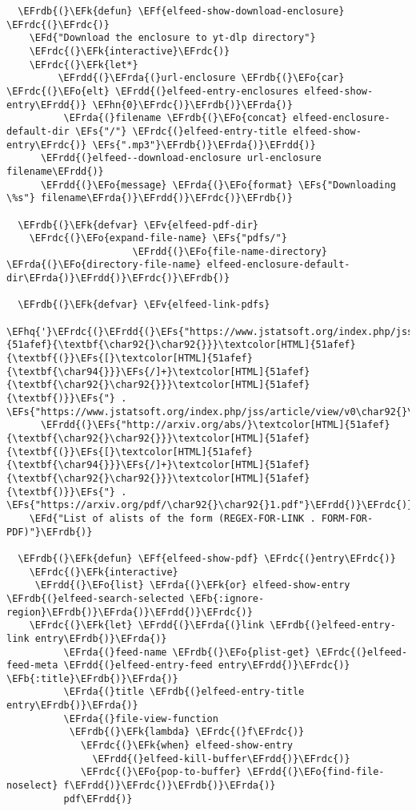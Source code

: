\documentclass[a4wide,10pt]{article}
\newcommand{\EFs}[1]{\textcolor{EFs}{#1}} %
\newcommand{\EFd}[1]{\textcolor{EFd}{#1}} %
\newcommand{\EFk}[1]{\textcolor{EFk}{#1}} %
\newcommand{\EFb}[1]{\textcolor{EFb}{#1}} %
\newcommand{\EFf}[1]{\textcolor{EFf}{#1}} %
\newcommand{\EFv}[1]{\textcolor{EFv}{#1}} %
\newcommand{\EFo}[1]{\textcolor{EFo}{#1}} %
\newcommand{\EFhn}[1]{\textcolor{EFhn}{\textbf{#1}}} %
\newcommand{\EFhq}[1]{\textcolor{EFhq}{#1}} %
\newcommand{\EFrda}[1]{\textcolor{EFrda}{#1}} %
\newcommand{\EFrdb}[1]{\textcolor{EFrdb}{#1}} %
\newcommand{\EFrdc}[1]{\textcolor{EFrdc}{#1}} %
\newcommand{\EFrdd}[1]{\textcolor{EFrdd}{#1}} %
\begin{document}
\begin{Code}
\begin{Verbatim}
  \EFrdb{(}\EFk{defun} \EFf{elfeed-show-download-enclosure} \EFrdc{(}\EFrdc{)}
    \EFd{"Download the enclosure to yt-dlp directory"}
    \EFrdc{(}\EFk{interactive}\EFrdc{)}
    \EFrdc{(}\EFk{let*}
         \EFrdd{(}\EFrda{(}url-enclosure \EFrdb{(}\EFo{car} \EFrdc{(}\EFo{elt} \EFrdd{(}elfeed-entry-enclosures elfeed-show-entry\EFrdd{)} \EFhn{0}\EFrdc{)}\EFrdb{)}\EFrda{)}
          \EFrda{(}filename \EFrdb{(}\EFo{concat} elfeed-enclosure-default-dir \EFs{"/"} \EFrdc{(}elfeed-entry-title elfeed-show-entry\EFrdc{)} \EFs{".mp3"}\EFrdb{)}\EFrda{)}\EFrdd{)}
      \EFrdd{(}elfeed--download-enclosure url-enclosure filename\EFrdd{)}
      \EFrdd{(}\EFo{message} \EFrda{(}\EFo{format} \EFs{"Downloading \%s"} filename\EFrda{)}\EFrdd{)}\EFrdc{)}\EFrdb{)}

  \EFrdb{(}\EFk{defvar} \EFv{elfeed-pdf-dir}
    \EFrdc{(}\EFo{expand-file-name} \EFs{"pdfs/"}
                      \EFrdd{(}\EFo{file-name-directory} \EFrda{(}\EFo{directory-file-name} elfeed-enclosure-default-dir\EFrda{)}\EFrdd{)}\EFrdc{)}\EFrdb{)}

  \EFrdb{(}\EFk{defvar} \EFv{elfeed-link-pdfs}
    \EFhq{'}\EFrdc{(}\EFrdd{(}\EFs{"https://www.jstatsoft.org/index.php/jss/article/view/v0}\textcolor[HTML]{51afef}{\textbf{\char92{}\char92{}}}\textcolor[HTML]{51afef}{\textbf{(}}\EFs{[}\textcolor[HTML]{51afef}{\textbf{\char94{}}}\EFs{/]+}\textcolor[HTML]{51afef}{\textbf{\char92{}\char92{}}}\textcolor[HTML]{51afef}{\textbf{)}}\EFs{"} . \EFs{"https://www.jstatsoft.org/index.php/jss/article/view/v0\char92{}\char92{}1/v\char92{}\char92{}1.pdf"}\EFrdd{)}
      \EFrdd{(}\EFs{"http://arxiv.org/abs/}\textcolor[HTML]{51afef}{\textbf{\char92{}\char92{}}}\textcolor[HTML]{51afef}{\textbf{(}}\EFs{[}\textcolor[HTML]{51afef}{\textbf{\char94{}}}\EFs{/]+}\textcolor[HTML]{51afef}{\textbf{\char92{}\char92{}}}\textcolor[HTML]{51afef}{\textbf{)}}\EFs{"} . \EFs{"https://arxiv.org/pdf/\char92{}\char92{}1.pdf"}\EFrdd{)}\EFrdc{)}
    \EFd{"List of alists of the form (REGEX-FOR-LINK . FORM-FOR-PDF)"}\EFrdb{)}

  \EFrdb{(}\EFk{defun} \EFf{elfeed-show-pdf} \EFrdc{(}entry\EFrdc{)}
    \EFrdc{(}\EFk{interactive}
     \EFrdd{(}\EFo{list} \EFrda{(}\EFk{or} elfeed-show-entry \EFrdb{(}elfeed-search-selected \EFb{:ignore-region}\EFrdb{)}\EFrda{)}\EFrdd{)}\EFrdc{)}
    \EFrdc{(}\EFk{let} \EFrdd{(}\EFrda{(}link \EFrdb{(}elfeed-entry-link entry\EFrdb{)}\EFrda{)}
          \EFrda{(}feed-name \EFrdb{(}\EFo{plist-get} \EFrdc{(}elfeed-feed-meta \EFrdd{(}elfeed-entry-feed entry\EFrdd{)}\EFrdc{)} \EFb{:title}\EFrdb{)}\EFrda{)}
          \EFrda{(}title \EFrdb{(}elfeed-entry-title entry\EFrdb{)}\EFrda{)}
          \EFrda{(}file-view-function
           \EFrdb{(}\EFk{lambda} \EFrdc{(}f\EFrdc{)}
             \EFrdc{(}\EFk{when} elfeed-show-entry
               \EFrdd{(}elfeed-kill-buffer\EFrdd{)}\EFrdc{)}
             \EFrdc{(}\EFo{pop-to-buffer} \EFrdd{(}\EFo{find-file-noselect} f\EFrdd{)}\EFrdc{)}\EFrdb{)}\EFrda{)}
          pdf\EFrdd{)}


\end{Verbatim}
\end{Code}
\end{document}
